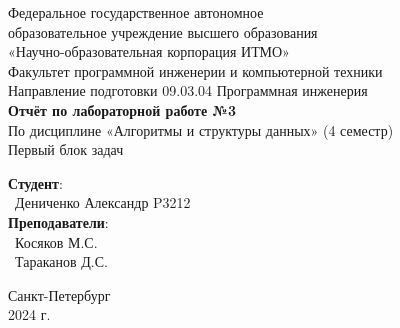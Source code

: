 \documentclass{article}
\begin{document}
\begin{center}
    \Large
    Федеральное государственное автономное \\
    образовательное учреждение высшего образования \\ 
    «Научно-образовательная корпорация ИТМО»\\
    \vspace{0.5cm}
    \large
    Факультет программной инженерии и компьютерной техники \\
    Направление подготовки 09.03.04 Программная инженерия \\
    \vspace{1cm}
    \Large
    \textbf{Отчёт по лабораторной работе №3} \\
    По дисциплине «Алгоритмы и структуры данных» (4 семестр)\\
    Первый блок задач\\
    \large
    \vspace{8cm}

    \begin{minipage}{.33\textwidth}
    \end{minipage}
    \hfill
    \begin{minipage}{.4\textwidth}
    
        \textbf{Студент}: \vspace{.1cm} \\
        \ Дениченко Александр P3212 \vspace{.1cm}\\
        \textbf{Преподаватели}:  \vspace{.1cm}\\
        \ Косяков М.С. \\
        \ Тараканов Д.С.
    \end{minipage}
    \vfill
Санкт-Петербург\\ 2024 г.
\end{center}

\newpage
\end{document}
